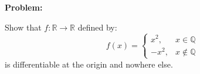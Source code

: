 \documentclass{article}
\theoremstyle{normal}
\newif\ifsolution
\begin{document}
        \par\hfill\par
        \textbf{Problem:}
        \par\hfill\par
        Show that $f:\mathbb{R}\rightarrow\mathbb{R}$ defined by:
        \begin{equation}
            f(x)
            =\begin{cases}
                x^{2},&x\in\mathbb{Q}\\
                -x^{2},&x\not\in\mathbb{Q}
            \end{cases}
        \end{equation}
        is differentiable at the origin and nowhere else.
        \par\hfill\par
        \ifsolution
            \color{blue}
            \textit{Solution.}
            \par\hfill\par
            The function is wedged between $x^{2}$ and $-x^{2}$, both of
            which are pretty flat near the origin. It is likely that the
            derivative is $0$, if it exists at all. Given $\varepsilon>0$,
            we want to find some $\delta>0$ such that $0<|x-0|<\delta$ implies:
            \begin{equation}
                \begin{array}{lrcl}
                    &
                    \displaystyle
                    \left|
                        0-\frac{f(x)-f(0)}{x-0}
                    \right|
                    &<&
                    \varepsilon\\[1em]
                    \Longleftrightarrow
                    &
                    \displaystyle
                    \left|
                        \frac{\pm{x}^{2}}{x}
                    \right|
                    &<&
                    \varepsilon\\[1em]
                    \Longleftrightarrow
                    &
                    \displaystyle
                    \left|\pm{x}\right|
                    &<&
                    \varepsilon\\[1em]
                    \Longleftrightarrow
                    &
                    |x|
                    &<&
                    \varepsilon
                \end{array}
            \end{equation}
            Choosing $\delta=\varepsilon$ solves our problems. For any
            non-zero $x$ the function is not even continuous, meaning it cannot
            possibly be differentiable.
        \fi
\end{document}
